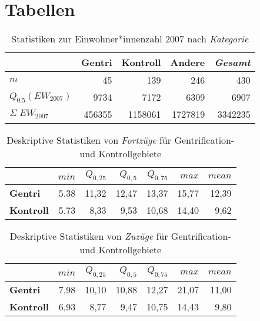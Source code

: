 \section{Tabellen}

\begin{table}[h]
\centering
\begin{tabular}{@{}lrrrr@{}}
\toprule
                                       & \multicolumn{1}{r}{{\bf Gentri}} & \multicolumn{1}{r}{{\bf Kontroll}} & \multicolumn{1}{r}{{\bf Andere}} & \multicolumn{1}{r}{{\bf \textit{Gesamt}}} \\ \midrule
$m$                                    & 45                               & 139                                & 246                              & 430                                  \\
$Q_{0.5}(EW_{2007})$                   & 9734                             & 7172                               & 6309                             & 6907                                 \\
$\Sigma\;EW_{2007}$                    & 456355                           & 1158061                            & 1727819                          & 3342235                              \\ \bottomrule
\end{tabular}
\caption{Statistiken zur Einwohner*innenzahl 2007 nach \textit{Kategorie}}\label{tab:KategorieEW}
\end{table}            

\begin{table}[h]
\centering
\begin{tabular}{@{}lrrrrrr@{}}
\toprule
               & $min$ & $Q_{0,25}$ & $Q_{0,5}$ & $Q_{0,75}$ & $max$ & $mean$ \\ \midrule
{\bf Gentri}   & 5.38 & 11,32 & 12,47 & 13,37 & 15,77 & 12,39 \\
{\bf Kontroll} & 5.73 &  8,33 &  9,53 & 10,68 & 14,40 & 9,62 \\ \bottomrule
\end{tabular}
\caption{Deskriptive Statistiken von \textit{Fortzüge} für Gentrification- und Kontrollgebiete}
\label{tab:FortzuegeR}
\end{table}

\begin{table}[h]
\centering
\begin{tabular}{@{}lrrrrrr@{}}
\toprule
               & $min$ & $Q_{0,25}$ & $Q_{0,5}$ & $Q_{0,75}$ & $max$ & $mean$ \\ \midrule
{\bf Gentri}   & 7,98 & 10,10 & 10,88 & 12,27 & 21,07 & 11,00 \\
{\bf Kontroll} & 6,93 & 8,77 & 9,47 & 10,75 & 14,43 &  9,80  \\ \bottomrule
\end{tabular}
\caption{Deskriptive Statistiken von \textit{Zuzüge} für Gentrification- und Kontrollgebiete}
\label{tab:ZuzuegeR}
\end{table}

